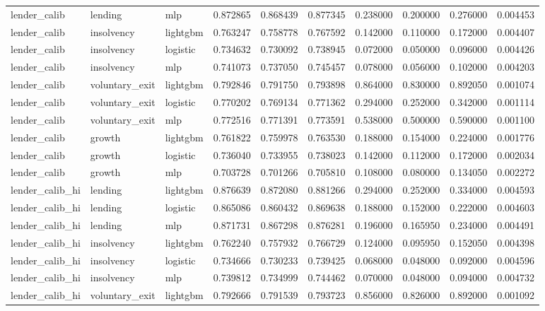 \begin{table}
{\begin{tabular}{lllrrrrrrr}
lender_calib & lending & mlp & 0.872865 & 0.868439 & 0.877345 & 0.238000 & 0.200000 & 0.276000 & 0.004453 \\
lender_calib & insolvency & lightgbm & 0.763247 & 0.758778 & 0.767592 & 0.142000 & 0.110000 & 0.172000 & 0.004407 \\
lender_calib & insolvency & logistic & 0.734632 & 0.730092 & 0.738945 & 0.072000 & 0.050000 & 0.096000 & 0.004426 \\
lender_calib & insolvency & mlp & 0.741073 & 0.737050 & 0.745457 & 0.078000 & 0.056000 & 0.102000 & 0.004203 \\
lender_calib & voluntary_exit & lightgbm & 0.792846 & 0.791750 & 0.793898 & 0.864000 & 0.830000 & 0.892050 & 0.001074 \\
lender_calib & voluntary_exit & logistic & 0.770202 & 0.769134 & 0.771362 & 0.294000 & 0.252000 & 0.342000 & 0.001114 \\
lender_calib & voluntary_exit & mlp & 0.772516 & 0.771391 & 0.773591 & 0.538000 & 0.500000 & 0.590000 & 0.001100 \\
lender_calib & growth & lightgbm & 0.761822 & 0.759978 & 0.763530 & 0.188000 & 0.154000 & 0.224000 & 0.001776 \\
lender_calib & growth & logistic & 0.736040 & 0.733955 & 0.738023 & 0.142000 & 0.112000 & 0.172000 & 0.002034 \\
lender_calib & growth & mlp & 0.703728 & 0.701266 & 0.705810 & 0.108000 & 0.080000 & 0.134050 & 0.002272 \\
lender_calib_hi & lending & lightgbm & 0.876639 & 0.872080 & 0.881266 & 0.294000 & 0.252000 & 0.334000 & 0.004593 \\
lender_calib_hi & lending & logistic & 0.865086 & 0.860432 & 0.869638 & 0.188000 & 0.152000 & 0.222000 & 0.004603 \\
lender_calib_hi & lending & mlp & 0.871731 & 0.867298 & 0.876281 & 0.196000 & 0.165950 & 0.234000 & 0.004491 \\
lender_calib_hi & insolvency & lightgbm & 0.762240 & 0.757932 & 0.766729 & 0.124000 & 0.095950 & 0.152050 & 0.004398 \\
lender_calib_hi & insolvency & logistic & 0.734666 & 0.730233 & 0.739425 & 0.068000 & 0.048000 & 0.092000 & 0.004596 \\
lender_calib_hi & insolvency & mlp & 0.739812 & 0.734999 & 0.744462 & 0.070000 & 0.048000 & 0.094000 & 0.004732 \\
lender_calib_hi & voluntary_exit & lightgbm & 0.792666 & 0.791539 & 0.793723 & 0.856000 & 0.826000 & 0.892000 & 0.001092 \\

\end{tabular}}
\end{table}

